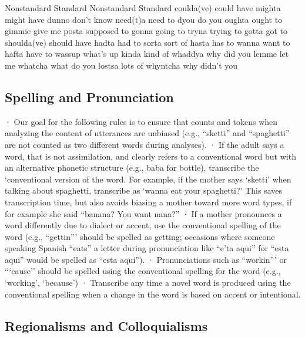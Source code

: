 \documentclass[
  12pt,
]{book}
\begin{document}
Nonstandard
Standard
Nonstandard
Standard
coulda(ve)
could have
mighta
might have
dunno
don't know
need(t)a
need to
dyou
do you
oughta
ought to
gimmie
give me
posta
supposed to
gonna
going to
tryna
trying to
gotta
got to
shoulda(ve)
should have
hadta
had to
sorta
sort of
hasta
has to
wanna
want to
hafta
have to
wassup
what's up
kinda
kind of
whaddya
why did you
lemme
let me
whatcha
what do you
lostsa
lots of
whyntcha
why didn't you

\hypertarget{spelling-and-pronunciation}{%
\subsection{Spelling and Pronunciation}\label{spelling-and-pronunciation}}

· Our goal for the following rules is to ensure that counts and tokens when analyzing the content of utterances are unbiased (e.g., ``sketti'' and ``spaghetti'' are not counted as two different words during analyses).
· If the adult says a word, that is not assimilation, and clearly refers to a conventional word but with an alternative phonetic structure (e.g., baba for bottle), transcribe the `conventional version of the word. For example, if the mother says `sketti' when talking about spaghetti, transcribe as `wanna eat your spaghetti?' This saves transcription time, but also avoids biasing a mother toward more word types, if for example she said ``banana? You want nana?''
· If a mother pronounces a word differently due to dialect or accent, use the conventional spelling of the word (e.g., ``gettin''' should be spelled as getting; occasions where someone speaking Spanish ``eats'' a letter during pronunciation like ``e'ta aqui'' for ``esta aqui'' would be spelled as ``esta aqui'').
· Pronunciations such as ``workin''' or ```cause'' should be spelled using the conventional spelling for the word (e.g., `working', `because')
· Transcribe any time a novel word is produced using the conventional spelling when a change in the word is based on accent or intentional.

\hypertarget{regionalisms-and-colloquialisms}{%
\subsection{Regionalisms and Colloquialisms}\label{regionalisms-and-colloquialisms}}
\end{document}
